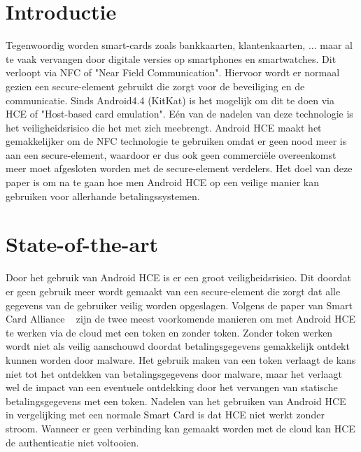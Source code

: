 
\section{Introductie} %
\label{sec:introductie}

Tegenwoordig worden smart-cards zoals bankkaarten, klantenkaarten, ... maar al te vaak vervangen door digitale versies op smartphones en smartwatches. Dit verloopt via NFC of "Near Field Communication". Hiervoor wordt er normaal gezien een secure-element gebruikt die zorgt voor de beveiliging en de communicatie. Sinds Android4.4 (KitKat) is het mogelijk om dit te doen via HCE of "Host-based card emulation". Eén van de nadelen van deze technologie is het veiligheidsrisico die het met zich meebrengt. Android HCE maakt het gemakkelijker om de NFC technologie te gebruiken omdat er geen nood meer is aan een secure-element, waardoor er dus ook geen commerciële overeenkomst meer moet afgesloten worden met de secure-element verdelers. Het doel van deze paper is om na te gaan hoe men Android HCE op een veilige manier kan gebruiken voor allerhande betalingssystemen.


\section{State-of-the-art}
\label{sec:state-of-the-art}

Door het gebruik van Android HCE is er een groot veiligheidsrisico. Dit doordat er geen gebruik meer wordt gemaakt van een secure-element die zorgt dat alle gegevens van de gebruiker veilig worden opgeslagen. Volgens de paper van Smart Card Alliance ~\autocite{SCA2014} zijn de twee meest voorkomende manieren om met Android HCE te werken via de cloud met een token en zonder token. Zonder token werken wordt niet als veilig aanschouwd doordat betalingsgegevens gemakkelijk ontdekt kunnen worden door malware. Het gebruik maken van een token verlaagt de kans niet tot het ontdekken van betalingsgegevens door malware, maar het verlaagt wel de impact van een eventuele ontdekking door het vervangen van statische betalingsgegevens met een token. Nadelen van het gebruiken van Android HCE ~\autocite{Borko2014} in vergelijking met een normale Smart Card is dat HCE niet werkt zonder stroom. Wanneer er geen verbinding kan gemaakt worden met de cloud kan HCE de authenticatie niet voltooien.


